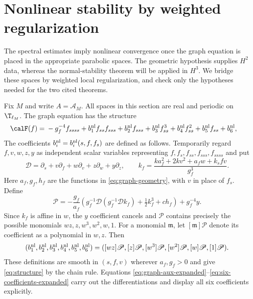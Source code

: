 \section{Nonlinear stability by weighted regularization}\label{sec:nonlinear}
The spectral estimates imply nonlinear convergence once the graph equation is placed in the appropriate parabolic spaces. The geometric hypothesis supplies $H^2$ data, whereas the normal-stability theorem will be applied in $H^3$. We bridge these spaces by weighted local regularization, and check only the hypotheses needed for the two cited theorems.

Fix $M$ and write $A=\mathcal A_M$. All spaces in this section are real and periodic on $\T_{\ell_M}$. The graph equation has the structure
\begin{equation}\label{eq:structure}
 \begin{aligned}
 \calF(f)={}&-g_f^{-4}f_{ssss}+b_1^{\rm nl}f_{ss}f_{sss}+b_2^{\rm nl}f_{sss}
              +b_3^{\rm nl}f_{ss}^3+b_4^{\rm nl}f_{ss}^2+b_5^{\rm nl}f_{ss}+b_6^{\rm nl},
 \end{aligned}
\end{equation}
The coefficients $b_i^{\rm nl}=b_i^{\rm nl}(s,f,f_s)$ are defined as follows. Temporarily regard $f,v,w,z,y$ as independent scalar variables representing $f,f_s,f_{ss},f_{sss},f_{ssss}$ and put
\[
 \mathscr D=\partial_s+v\partial_f+w\partial_v+z\partial_w+y\partial_z,
 \qquad k_f=\frac{ka_f^2+2kv^2+a_fw+k_sfv}{g_f^3}.
\]
Here $a_f,g_f,h_f$ are the functions in \eqref{eq:graph-geometry}, with $v$ in place of $f_s$. Define
\[
 \mathscr P=-\frac{g_f}{a_f}
 \left(g_f^{-1}\mathscr D(g_f^{-1}\mathscr D k_f)+\tfrac12k_f^3+ch_f\right)
 +g_f^{-4}y.
\]
Since $k_f$ is affine in $w$, the $y$ coefficient cancels and $\mathscr P$ contains precisely the possible monomials $wz,z,w^3,w^2,w,1$. For a monomial $\mathfrak m$, let $[\mathfrak m]\mathscr P$ denote its coefficient as a polynomial in $w,z$. Then
\[
 (b_1^{\rm nl},b_2^{\rm nl},b_3^{\rm nl},b_4^{\rm nl},b_5^{\rm nl},b_6^{\rm nl})
 =([wz]\mathscr P,[z]\mathscr P,[w^3]\mathscr P,[w^2]\mathscr P,[w]\mathscr P,[1]\mathscr P).
\]
These definitions are smooth in $(s,f,v)$ wherever $a_f,g_f>0$ and give \eqref{eq:structure} by the chain rule. Equations \eqref{eq:graph-aux-expanded}--\eqref{eq:six-coefficients-expanded} carry out the differentiations and display all six coefficients explicitly.

